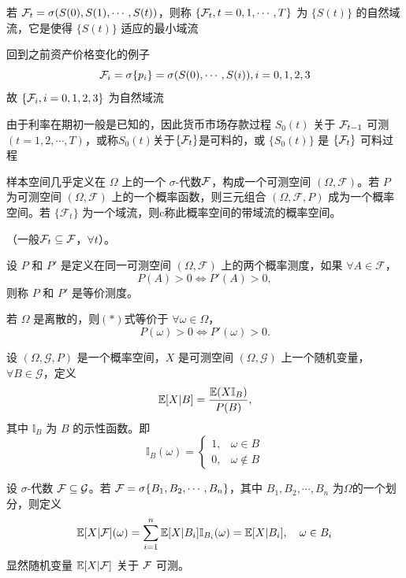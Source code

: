 \begin{definition}[自然域流]
    若 $\mathcal{F}_t=\sigma(S(0),S(1),\cdots,S(t))$，则称 $\{\mathcal{F}_t,t=0,1,\cdots,T\}$ 为 $\{S(t)\}$ 的自然域流，它是使得 $\{S(t)\}$ 适应的最小域流
\end{definition}

回到之前资产价格变化的例子
\[
\mathcal{F}_i=\sigma \{p_i\}=\sigma(S(0),\cdots,S(i)),i=0,1,2,3
\]
故 $\{\mathcal{F}_i,i=0,1,2,3\}$ 为自然域流

\begin{definition}[可料]
    由于利率在期初一般是已知的，因此货币市场存款过程 $S_0(t)$ 关于 $\mathcal{F}_{t-1}$ 可测$(t=1,2,\cdots,T)$，或称$S_0(t)$关于$\{\mathcal{F}_t\}$是可料的，或 $\{S_0(t)\}$ 是 $\{\mathcal{F}_t\}$ 可料过程
\end{definition}

\begin{definition}[带域流的概率空间]
样本空间几乎定义在 \( \Omega \) 上的一个 \( \sigma \)-代数$\mathcal{F}$，构成一个可测空间 \( (\Omega, \mathcal{F}) \)。若 \( P \) 为可测空间 \( (\Omega, \mathcal{F}) \) 上的一个概率函数，则三元组合 \( (\Omega, \mathcal{F}, P) \) 成为一个概率空间。若 \( \{ \mathcal{F}_t \} \) 为一个域流，则c称此概率空间的带域流的概率空间。

（一般$\mathcal{F}_t\subseteq \mathcal{F}$，\(\forall t\)）。
\end{definition}

\begin{definition}[等价测度]
设 \( P \) 和 \( P' \) 是定义在同一可测空间 \( (\Omega, \mathcal{F}) \) 上的两个概率测度，如果 \( \forall A \in \mathcal{F} \)，
\[
P(A) > 0 \iff P'(A) > 0,
\tag{$*$}
\]
则称 \( P \) 和 \( P' \) 是等价测度。
\end{definition}

若 \( \Omega \) 是离散的，则$(*)$式等价于 \( \forall \omega \in \Omega \)，
\[
P(\omega) > 0 \iff P'(\omega) > 0.
\]

\begin{definition}[条件期望]
设 \( ( \Omega, \mathcal{G}, P ) \) 是一个概率空间，\( X \) 是可测空间 \( ( \Omega, \mathcal{G} ) \) 上一个随机变量，\( \forall B \in \mathcal{G} \)，定义
\[
\mathbb E[X|B] = \frac{\mathbb E(X\mathbb{I}_B)}{P(B)},
\]
其中 \( \mathbb{I}_B \) 为 \( B \) 的示性函数。即
\[
\mathbb{I}_B(\omega) = 
\begin{cases} 
1, & \omega \in B \\
0, & \omega \notin B 
\end{cases}
\]
\end{definition}

设 \(\sigma\)-代数 \( \mathcal{F} \subseteq \mathcal{G} \)。若 \( \mathcal{F} = \sigma\{B_1, B_2, \cdots, B_n\} \)，其中 \( B_1, B_2, \cdots, B_n \) 为$\Omega$的一个划分，则定义
\[
\mathbb E[X|\mathcal{F}](\omega) = \sum_{i=1}^{n} \mathbb E[X|B_i] \mathbb{I}_{B_i}(\omega) = \mathbb E[X|B_i],\quad \omega\in B_i
\]
显然随机变量 \( \mathbb E[X|\mathcal{F}] \) 关于 \( \mathcal{F} \) 可测。

